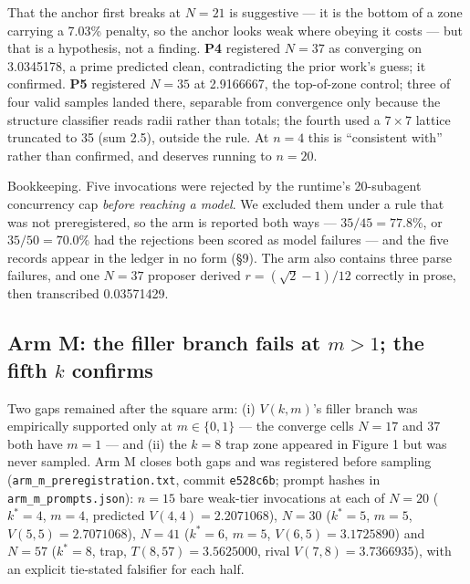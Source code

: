 That the anchor first breaks at $N = 21$ is suggestive --- it is the bottom of a zone carrying a
7.03\% penalty, so the anchor looks weak where obeying it costs --- but that is a hypothesis, not
a finding. \textbf{P4} registered $N = 37$ as converging on 3.0345178, a prime predicted clean,
contradicting the prior work's guess; it confirmed. \textbf{P5} registered $N = 35$ at 2.9166667, the
top-of-zone control; three of four valid samples landed there, separable from convergence only
because the structure classifier reads radii rather than totals; the fourth used a $7 \times 7$
lattice truncated to 35 (sum 2.5), outside the rule. At $n = 4$ this is ``consistent with'' rather
than confirmed, and deserves running to $n = 20$.

Bookkeeping. Five invocations were rejected by the runtime's 20-subagent concurrency cap
\emph{before reaching a model}. We excluded them under a rule that was not preregistered, so the arm
is reported both ways --- $35/45 = 77.8\%$, or $35/50 = 70.0\%$ had the rejections been scored as model
failures --- and the five records appear in the ledger in no form (\S9). The arm
also contains three parse failures, and one $N = 37$ proposer derived
$r = (\sqrt{2}-1)/12$ correctly in prose, then transcribed 0.03571429.

\subsection{Arm M: the filler branch fails at $m > 1$; the fifth $k$ confirms}

Two gaps remained after the square arm: (i) $V(k, m)$'s filler branch
was empirically supported only at $m \in \{0, 1\}$ --- the converge cells $N = 17$ and 37 both have
$m = 1$ --- and (ii) the $k = 8$ trap zone appeared in Figure 1 but was never sampled. Arm M closes
both gaps and was registered before sampling (\texttt{arm\_m\_preregistration.txt}, commit \texttt{e528c6b};
prompt hashes in \texttt{arm\_m\_prompts.json}): $n = 15$ bare weak-tier invocations at each of $N = 20$
($k^* = 4$, $m = 4$, predicted $V(4,4) = 2.2071068$), $N = 30$ ($k^* = 5$, $m = 5$, $V(5,5) = 2.7071068$),
$N = 41$ ($k^* = 6$, $m = 5$, $V(6,5) = 3.1725890$) and $N = 57$ ($k^* = 8$, trap, $T(8,57) = 3.5625000$,
rival $V(7,8) = 3.7366935$), with an explicit tie-stated falsifier for each half.

